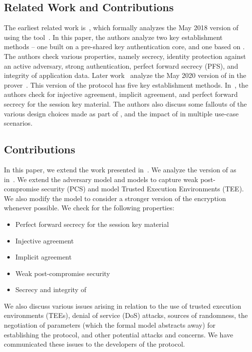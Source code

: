 \subsection{Related Work and Contributions}
\label{sub:related}
The earliest related work is~\cite{DBLP:conf/secsr/BruniJPS18}, which formally 
analyzes the May 2018 version of \mEdhoc{} using the \mProverif{} 
tool~\cite{DBLP:conf/csfw/Blanchet01}. 
%
In this paper, the authors analyze two key establishment methods -- one built 
on
a pre-shared key authentication core, and one based on \mSigma{}. 
%
The authors check  various properties, namely secrecy, identity protection 
against an active adversary, strong authentication, perfect forward secrecy 
(PFS), and integrity of application data. 
%
Later work~\cite{Norr21} analyze the May 2020 version of \mEdhoc{} in the 
\mTamarin{} prover~\cite{DBLP:conf/cav/MeierSCB13}. 
%
This version of the protocol has five key establishment methods. 
%
In~\cite{Norr21}, the authors check for injective agreement, implicit 
agreement, and perfect forward secrecy for the session key material. 
%
The authors also discuss some fallouts of the various design choices made as 
part of \mEdhoc{}, and the impact of \mEdhoc{} in multiple use-case scenarios.

\subsection{Contributions}
\label{sec:contributions}
In this paper, we extend the work presented in~\cite{Norr21}. 
%
We analyze the version of \mEdhoc{} as in~\cite{}.
%
We extend the adversary model and \mTamarin{} models to capture weak
post-compromise security (PCS) and model Trusted Execution Environments
(TEE).
%
We also modify the model to consider a stronger version of the \mXor{} encryption whenever possible. 
%
We check for the following properties: 
\begin{itemize}
\item Perfect forward secrecy for the session key material
\item Injective agreement
\item Implicit agreement
\item Weak post-compromise security
\item Secrecy and integrity of \mADthree
\end{itemize}
%
We also discuss various issues arising in relation to the use of trusted 
execution environments (TEEs), denial of service (DoS) attacks, sources of 
randomness, the negotiation of parameters (which the formal model abstracts 
away) for establishing the protocol, and other potential attacks and concerns.
%
We have communicated these issues to the developers of the protocol.

